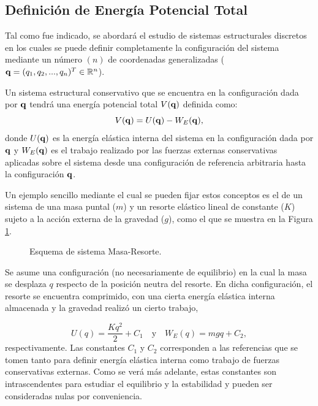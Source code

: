 \subsection{Definición de Energía Potencial Total}\label{TPE_Def}

Tal como fue indicado, se abordará el estudio de sistemas estructurales discretos en los cuales se puede definir completamente la configuración del sistema mediante un número $(n)$ de coordenadas generalizadas (${\bf q}=(q_1,q_2,...,q_n)^T\in\mathbb{R}^n$).

Un sistema estructural conservativo que se encuentra en la configuración dada por ${\bf q}$ tendrá una energía potencial total $V({\bf q})$ definida como: %
%
\begin{equation}
V({\bf q}) = U({\bf q}) - W_E({\bf q}),
\end{equation}
%
donde $U({\bf q})$ es la energía elástica interna del sistema en la configuración dada por ${\bf q}$ y $W_E({\bf q})$ es el trabajo realizado por las fuerzas externas conservativas aplicadas sobre el sistema desde una configuración de referencia arbitraria hasta la configuración ${\bf q}$.

Un ejemplo sencillo mediante el cual se pueden fijar estos conceptos es el de un sistema de una masa puntal ($m$) y un resorte elástico lineal de constante ($K$) sujeto a la acción externa de la gravedad ($g$), como el que se muestra en la Figura \ref{fig:fig7}.

\begin{figure}[htb]
	\centering
   \def\svgwidth{0.3\textwidth}

	\caption{Esquema de sistema Masa-Resorte.}
	\label{fig:fig7}
\end{figure}

Se asume una configuración (no necesariamente de equilibrio) en la cual la masa se desplaza $q$ respecto de la posición neutra del resorte. En dicha configuración, el resorte se encuentra comprimido, con una cierta energía elástica interna almacenada y la gravedad realizó un cierto trabajo,

\begin{equation}
U(q)=\frac{Kq^2}{2}+C_1 \quad \text{y} \quad W_E(q)=mgq + C_2,
\end{equation}
%
respectivamente. %
%
Las constantes $C_1$ y $C_2$ corresponden a las referencias que se tomen tanto para definir energía elástica interna como trabajo de fuerzas conservativas externas. Como se verá más adelante, estas constantes son intrascendentes para estudiar el equilibrio y la estabilidad y pueden ser consideradas nulas por conveniencia.

